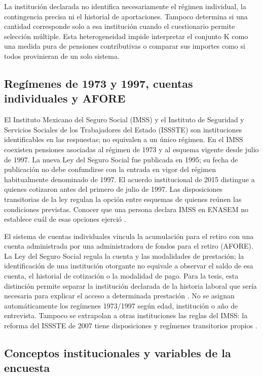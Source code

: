 La institución declarada no identifica necesariamente el régimen individual,
la contingencia precisa ni el historial de aportaciones. Tampoco determina
si una cantidad corresponde solo a esa institución cuando el cuestionario
permite selección múltiple. Esta heterogeneidad impide interpretar el conjunto
K como una medida pura de pensiones contributivas o comparar sus importes
como si todos provinieran de un solo sistema.

\subsection{Regímenes de 1973 y 1997, cuentas individuales y AFORE}

El Instituto Mexicano del Seguro Social (IMSS) y el Instituto de Seguridad
y Servicios Sociales de los Trabajadores del Estado (ISSSTE) son instituciones
identificables en las respuestas; no equivalen a un único régimen.
En el IMSS coexisten pensiones asociadas al régimen de 1973 y al esquema
vigente desde julio de 1997. La nueva Ley del Seguro Social fue publicada en
1995; su fecha de publicación no debe confundirse con la entrada en vigor
del régimen habitualmente denominado de 1997. El acuerdo institucional de 2015 distingue a quienes cotizaron antes
del primero de julio de 1997. Las disposiciones transitorias de la ley
regulan la opción entre esquemas de quienes reúnen las condiciones previstas. Conocer que una persona declara IMSS en ENASEM no
establece cuál de esas opciones ejerció \citep{lss1995,imss2015regimenes}.

El sistema de cuentas individuales vincula la acumulación para el retiro con
una cuenta administrada por una administradora de fondos para el retiro (AFORE). La Ley del Seguro Social regula la
cuenta y las modalidades de prestación; la identificación de una institución
otorgante no equivale a observar el saldo de esa cuenta, el historial de
cotización o la modalidad de pago. Para la tesis, esta distinción permite
separar la institución declarada de la historia laboral que sería necesaria
para explicar el acceso a determinada prestación \citep[arts.~159 y 175]{lss1995}.
No se asignan automáticamente los regímenes 1973/1997 según edad, institución
o año de entrevista. Tampoco se extrapolan a otras instituciones las reglas
del IMSS: la reforma del ISSSTE de 2007 tiene disposiciones y regímenes
transitorios propios \citep{issste2007}.


\subsection{Conceptos institucionales y variables de la encuesta}

